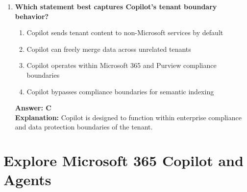 \documentclass[10pt]{article}
\begin{document}
\begin{enumerate}[leftmargin=*]
\item \textbf{Which statement best captures Copilot’s tenant boundary behavior?}
\begin{enumerate}[label=\Alph*.]
  \item Copilot sends tenant content to non-Microsoft services by default
  \item Copilot can freely merge data across unrelated tenants
  \item Copilot operates within Microsoft 365 and Purview compliance boundaries
  \item Copilot bypasses compliance boundaries for semantic indexing
\end{enumerate}
\textbf{Answer: C}\\
\textbf{Explanation:} Copilot is designed to function within enterprise compliance and data protection boundaries of the tenant.

\end{enumerate}



\clearpage
\section{Explore Microsoft 365 Copilot and Agents}
\setcounter{subsection}{0}
\clearpage
\end{document}
